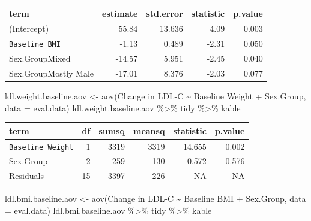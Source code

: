 \documentclass[
]{article}
\newenvironment{Shaded}{\begin{snugshade}}{\end{snugshade}}
\newcommand{\AttributeTok}[1]{\textcolor[rgb]{0.77,0.63,0.00}{#1}}
\newcommand{\FunctionTok}[1]{\textcolor[rgb]{0.00,0.00,0.00}{#1}}
\newcommand{\NormalTok}[1]{#1}
\newcommand{\OtherTok}[1]{\textcolor[rgb]{0.56,0.35,0.01}{#1}}
\newcommand{\SpecialCharTok}[1]{\textcolor[rgb]{0.00,0.00,0.00}{#1}}
\newcommand{\StringTok}[1]{\textcolor[rgb]{0.31,0.60,0.02}{#1}}
\begin{document}
\begin{longtable}[]{@{}lrrrr@{}}
\toprule
term & estimate & std.error & statistic & p.value \\
\midrule
\endhead
(Intercept) & 55.84 & 13.636 & 4.09 & 0.003 \\
\texttt{Baseline\ BMI} & -1.13 & 0.489 & -2.31 & 0.050 \\
Sex.GroupMixed & -14.57 & 5.951 & -2.45 & 0.040 \\
Sex.GroupMostly Male & -17.01 & 8.376 & -2.03 & 0.077 \\
\bottomrule
\end{longtable}

\begin{Shaded}
\begin{Highlighting}[]
\NormalTok{ldl.weight.baseline.aov }\OtherTok{\textless{}{-}} \FunctionTok{aov}\NormalTok{(}\StringTok{\textasciigrave{}}\AttributeTok{Change in LDL{-}C}\StringTok{\textasciigrave{}} \SpecialCharTok{\textasciitilde{}} \StringTok{\textasciigrave{}}\AttributeTok{Baseline Weight}\StringTok{\textasciigrave{}} \SpecialCharTok{+} \StringTok{\textasciigrave{}}\AttributeTok{Sex.Group}\StringTok{\textasciigrave{}}\NormalTok{, }\AttributeTok{data =}\NormalTok{ eval.data)}
\NormalTok{ldl.weight.baseline.aov }\SpecialCharTok{\%\textgreater{}\%}\NormalTok{ tidy }\SpecialCharTok{\%\textgreater{}\%}\NormalTok{ kable}
\end{Highlighting}
\end{Shaded}

\begin{longtable}[]{@{}lrrrrr@{}}
\toprule
term & df & sumsq & meansq & statistic & p.value \\
\midrule
\endhead
\texttt{Baseline\ Weight} & 1 & 3319 & 3319 & 14.655 & 0.002 \\
Sex.Group & 2 & 259 & 130 & 0.572 & 0.576 \\
Residuals & 15 & 3397 & 226 & NA & NA \\
\bottomrule
\end{longtable}

\begin{Shaded}
\begin{Highlighting}[]
\NormalTok{ldl.bmi.baseline.aov }\OtherTok{\textless{}{-}} \FunctionTok{aov}\NormalTok{(}\StringTok{\textasciigrave{}}\AttributeTok{Change in LDL{-}C}\StringTok{\textasciigrave{}} \SpecialCharTok{\textasciitilde{}} \StringTok{\textasciigrave{}}\AttributeTok{Baseline BMI}\StringTok{\textasciigrave{}} \SpecialCharTok{+} \StringTok{\textasciigrave{}}\AttributeTok{Sex.Group}\StringTok{\textasciigrave{}}\NormalTok{, }\AttributeTok{data =}\NormalTok{ eval.data)}
\NormalTok{ldl.bmi.baseline.aov }\SpecialCharTok{\%\textgreater{}\%}\NormalTok{ tidy }\SpecialCharTok{\%\textgreater{}\%}\NormalTok{ kable}
\end{Highlighting}
\end{Shaded}
\end{document}
